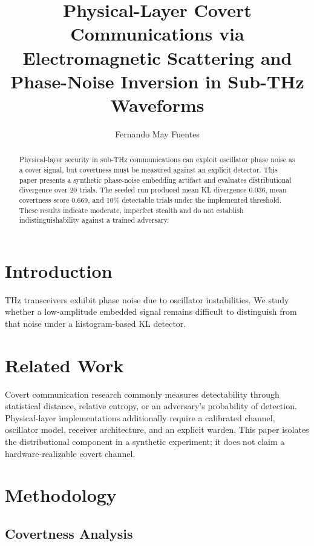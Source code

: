 \documentclass[sigconf]{acmart}
\title{Physical-Layer Covert Communications via Electromagnetic Scattering and Phase-Noise Inversion in Sub-THz Waveforms}
\author{Fernando May Fuentes}
\affiliation{
  \institution{Instituto Polit\'{e}cnico Nacional}
  \city{Ciudad de M\'{e}xico}
  \country{M\'{e}xico}
}
\begin{document}
\begin{abstract}
Physical-layer security in sub-THz communications can exploit oscillator phase noise as a cover signal, but covertness must be measured against an explicit detector. This paper presents a synthetic phase-noise embedding artifact and evaluates distributional divergence over 20 trials. The seeded run produced mean KL divergence 0.036, mean covertness score 0.669, and 10\% detectable trials under the implemented threshold. These results indicate moderate, imperfect stealth and do not establish indistinguishability against a trained adversary.
\end{abstract}


\maketitle

\section{Introduction}

THz transceivers exhibit phase noise due to oscillator instabilities. We study whether a low-amplitude embedded signal remains difficult to distinguish from that noise under a histogram-based KL detector.

\section{Related Work}

Covert communication research commonly measures detectability through statistical distance, relative entropy, or an adversary's probability of detection. Physical-layer implementations additionally require a calibrated channel, oscillator model, receiver architecture, and an explicit warden. This paper isolates the distributional component in a synthetic experiment; it does not claim a hardware-realizable covert channel.

\section{Methodology}

\subsection{Covertness Analysis}
\end{document}
